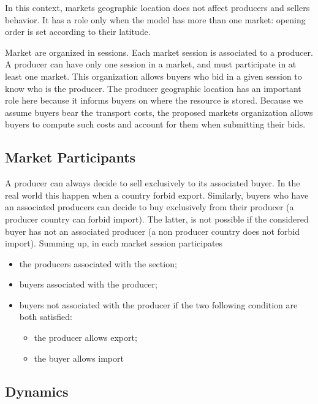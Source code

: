 \documentclass{article}
\begin{document}
In this context, markets geographic location does not affect producers and sellers behavior. It has a role only when the model has more than one market: opening order is set according to their latitude.

Market are organized in sessions. Each market session is associated to a producer. A producer can have only one session in a market, and must participate in at least one market. This organization allows buyers who bid in a given session to know who is the producer. The producer geographic location has an important role here because it informs buyers on where the resource is stored. Because we assume buyers bear the transport costs, the proposed markets organization allows buyers to compute such costs and account for them when submitting their bids.
\subsection{Market Participants}
A producer can always decide to sell exclusively to its associated buyer. In the real world this happen when a country forbid export. Similarly, buyers who have an associated producers can decide to buy exclusively from their producer (a producer country can forbid import). The latter, is not possible if the considered buyer has not an associated producer (a non producer country does not forbid import). 
Summing up, in each market session participates 
\begin{itemize}
	\item the producers associated with the section;
	\item buyers associated with the producer;
	\item buyers not associated with the producer if the two following condition are both satisfied:
		\begin{itemize}
			\item the producer allows export;
			\item the buyer allows import
		\end{itemize}
\end{itemize}

\subsection{Dynamics}
\end{document}
